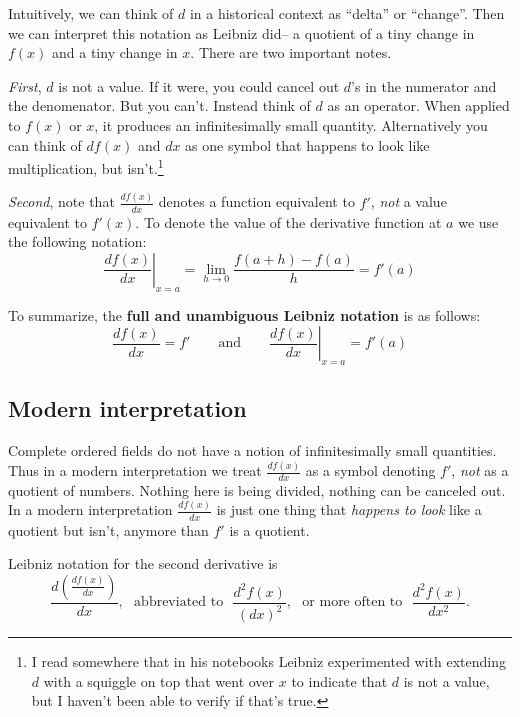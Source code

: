Intuitively, we can think of $d$ in a historical context as ``delta''
or ``change''. Then we can interpret this notation as Leibniz did-- a
quotient of a tiny change in $f(x)$ and a tiny change in $x$. There
are two important notes.

\vs

\textit{First}, $d$ is not a value. If it were, you could cancel out
$d$'s in the numerator and the denomenator. But you can't. Instead
think of $d$ as an operator. When applied to $f(x)$ or $x$, it
produces an infinitesimally small quantity. Alternatively you can
think of $df(x)$ and $dx$ as one symbol that happens to look like
multiplication, but isn't.\footnote{I read somewhere that in his
  notebooks Leibniz experimented with extending $d$ with a squiggle on
  top that went over $x$ to indicate that $d$ is not a value, but I
  haven't been able to verify if that's true.}

\vs

\textit{Second}, note that $\frac{df(x)}{dx}$ denotes a function
equivalent to $f'$, \textit{not} a value equivalent to $f'(x)$. To
denote the value of the derivative function at $a$ we use the
following notation:
\[\left. \frac{d f(x)}{dx} \right|_{x=a}=\lim_{h\to0}\frac{f(a+h)-f(a)}{h}=f'(a)\]

To summarize, the \textbf{full and unambiguous Leibniz notation} is as
follows:
\[\frac{df(x)}{dx}=f' \qquad\text{and}\qquad \left. \frac{d f(x)}{dx} \right|_{x=a}=f'(a)\]


\subsection{Modern interpretation}

Complete ordered fields do not have a notion of infinitesimally small
quantities. Thus in a modern interpretation we treat
$\frac{df(x)}{dx}$ as a symbol denoting $f'$, \textit{not} as a
quotient of numbers. Nothing here is being divided, nothing can be
canceled out. In a modern interpretation $\frac{df(x)}{dx}$ is just
one thing that \textit{happens to look} like a quotient but isn't,
anymore than $f'$ is a quotient.

\vs



\vs

Leibniz notation for the second derivative is
\[\frac{d\left(\frac{df(x)}{dx}\right)}{dx},\ \ \ \text{abbreviated
    to}\ \ \ \frac{d^2f(x)}{(dx)^2}, \ \ \ \text{or more often to}\ \
  \ \frac{d^2f(x)}{dx^2}.\]

